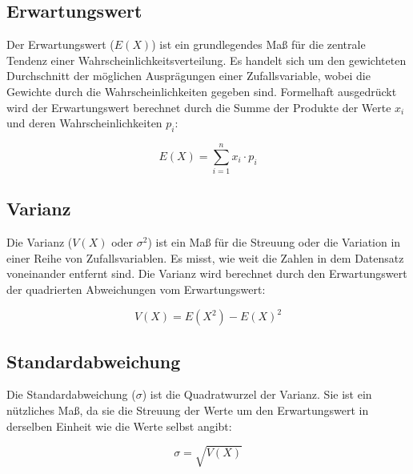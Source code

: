 \subsection{Erwartungswert}
Der Erwartungswert ($E(X)$) ist ein grundlegendes Maß für die zentrale Tendenz einer Wahrscheinlichkeitsverteilung.
Es handelt sich um den gewichteten Durchschnitt der möglichen Ausprägungen einer Zufallsvariable, wobei die Gewichte durch die Wahrscheinlichkeiten gegeben sind.
Formelhaft ausgedrückt wird der Erwartungswert berechnet durch die Summe der Produkte der Werte $x_i$ und deren Wahrscheinlichkeiten $p_i$:

\[
    E(X) = \sum_{i=1}^{n} x_i \cdot p_i
\]

\subsection{Varianz}
Die Varianz ($V(X)$ oder $\sigma^2$) ist ein Maß für die Streuung oder die Variation in einer Reihe von Zufallsvariablen.
Es misst, wie weit die Zahlen in dem Datensatz voneinander entfernt sind.
Die Varianz wird berechnet durch den Erwartungswert der quadrierten Abweichungen vom Erwartungswert:

\[
    V(X) = E(X^2) - E(X)^2
\]

\subsection{Standardabweichung}
Die Standardabweichung ($\sigma$) ist die Quadratwurzel der Varianz.
Sie ist ein nützliches Maß, da sie die Streuung der Werte um den Erwartungswert in derselben Einheit wie die Werte selbst angibt:

\[
    \sigma = \sqrt{V(X)}
\]

